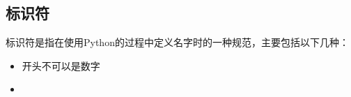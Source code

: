 
\subsection{标识符}
标识符是指在使用Python的过程中定义名字时的一种规范，主要包括以下几种：
\begin{itemize}
\item 开头不可以是数字
\item 
\end{itemize}
